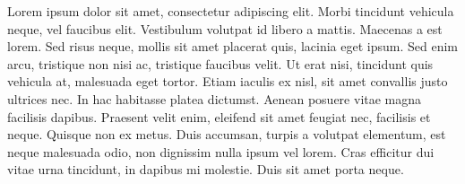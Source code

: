
Lorem ipsum dolor sit amet, consectetur adipiscing elit. Morbi tincidunt vehicula neque, vel faucibus elit. Vestibulum volutpat id libero a mattis. Maecenas a est lorem. Sed risus neque, mollis sit amet placerat quis, lacinia eget ipsum. Sed enim arcu, tristique non nisi ac, tristique faucibus velit. Ut erat nisi, tincidunt quis vehicula at, malesuada eget tortor. Etiam iaculis ex nisl, sit amet convallis justo ultrices nec. In hac habitasse platea dictumst. Aenean posuere vitae magna facilisis dapibus. Praesent velit enim, eleifend sit amet feugiat nec, facilisis et neque. Quisque non ex metus. Duis accumsan, turpis a volutpat elementum, est neque malesuada odio, non dignissim nulla ipsum vel lorem. Cras efficitur dui vitae urna tincidunt, in dapibus mi molestie. Duis sit amet porta neque.

